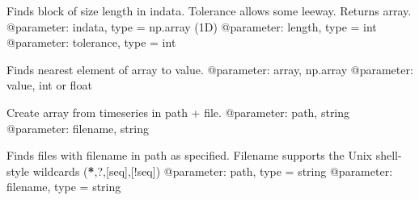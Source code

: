 \documentclass[letterpaper,10pt,english]{sphinxmanual}
\begin{document}

\begin{fulllineitems}
\label{\detokenize{index:windtunnel.find_block}}
Finds block of size length in indata. Tolerance allows some leeway.
Returns array.
@parameter: indata, type = np.array (1D)
@parameter: length, type = int
@parameter: tolerance, type = int

\end{fulllineitems}


\begin{fulllineitems}
\label{\detokenize{index:windtunnel.find_nearest}}
Finds nearest element of array to value.
@parameter: array, np.array
@parameter: value, int or float

\end{fulllineitems}


\begin{fulllineitems}
\label{\detokenize{index:windtunnel.from_file}}
Create array from timeseries in path + file.
@parameter: path, string
@parameter: filename, string

\end{fulllineitems}


\begin{fulllineitems}
\label{\detokenize{index:windtunnel.get_files}}
Finds files with filename in path as specified. Filename supports the
Unix shell-style wildcards ({\color{red}\bfseries{}*},?,{[}seq{]},{[}!seq{]})
@parameter: path, type = string
@parameter: filename, type = string

\end{fulllineitems}

\end{document}
